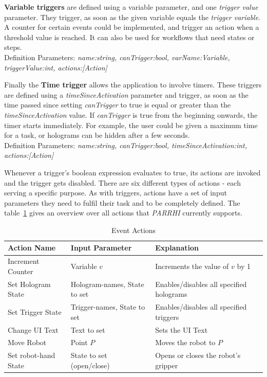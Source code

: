 \textbf{Variable triggers} are defined using a variable parameter, and one \textit{trigger value} parameter. They trigger, as soon as the given variable equals the \textit{trigger variable}. A counter for certain events could be implemented, and trigger an action when a threshold value is reached. It can also be used for workflows that need states or steps. \\Definition Parameters: \textit{name:string, canTrigger:bool, varName:Variable, triggerValue:int, actions:[Action]}

Finally the \textbf{Time trigger} allows the application to involve timers. These triggers are defined using a \textit{timeSinceActivation} parameter and trigger, as soon as the time passed since setting \textit{canTrigger} to true is equal or greater than the \textit{timeSinceActivation} value. If \textit{canTrigger} is true from the beginning onwards, the timer starts immediately. For example, the user could be given a maximum time for a task, or holograms can be hidden after a few seconds.\\Definition Parameters: \textit{name:string, canTrigger:bool, timeSinceActivation:int, actions:[Action]}

Whenever a trigger's boolean expression evaluates to true, its actions are invoked and the trigger gets disabled. There are six different types of actions - each serving a specific purpose. As with triggers, actions have a set of input parameters they need to fulfil their task and to be completely defined. The table~\ref{Table:Actions} gives an overview over all actions that \textit{PARRHI} currently supports.

\begin{table}
	\caption{Event Actions}
	\label{Table:Actions}
	\centering
	\begin{tabular}{lll}
		\toprule
		Action Name & Input Parameter		& Explanation	\\		
		\midrule
		Increment Counter  	& Variable $v$					& Increments the value of $v$ by 1 \\
		Set Hologram State 	& Hologram-names, State to set	& Enables/disables all specified holograms \\
		Set Trigger State  	& Trigger-names, State to set  	& Enables/disables all specified triggers \\
		Change UI Text	  	& Text to set					& Sets the UI Text\\
		Move Robot			& Point $P$						& Moves the robot to $P$ \\
		Set robot-hand State & State to set (open/close)		& Opens or closes the robot's gripper \\
		\bottomrule
	\end{tabular}
\end{table}

